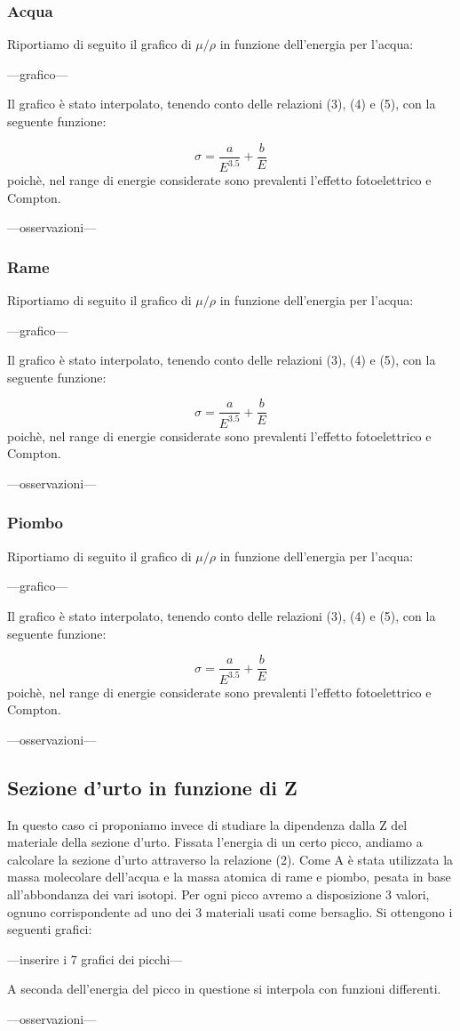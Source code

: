 \documentclass[a4paper,10pt]{article}
\begin{document}
\subsubsection{Acqua}
Riportiamo di seguito il grafico di $\mu/\rho$ in funzione dell'energia per l'acqua:

---grafico---

Il grafico è stato interpolato, tenendo conto delle relazioni (3), (4) e (5), con la seguente funzione:

\begin{equation}
	\sigma = \frac{a}{E^{3.5}} + \frac{b}{E}
\end{equation}
poichè, nel range di energie considerate sono prevalenti l'effetto fotoelettrico e Compton. 

---osservazioni---

\subsubsection{Rame}
Riportiamo di seguito il grafico di $\mu/\rho$ in funzione dell'energia per l'acqua:

---grafico---

Il grafico è stato interpolato, tenendo conto delle relazioni (3), (4) e (5), con la seguente funzione:

\begin{equation}
	\sigma = \frac{a}{E^{3.5}} + \frac{b}{E}
\end{equation}
poichè, nel range di energie considerate sono prevalenti l'effetto fotoelettrico e Compton. 

---osservazioni---
\subsubsection{Piombo}
Riportiamo di seguito il grafico di $\mu/\rho$ in funzione dell'energia per l'acqua:

---grafico---

Il grafico è stato interpolato, tenendo conto delle relazioni (3), (4) e (5), con la seguente funzione:

\begin{equation}
	\sigma = \frac{a}{E^{3.5}} + \frac{b}{E}
\end{equation}
poichè, nel range di energie considerate sono prevalenti l'effetto fotoelettrico e Compton. 

---osservazioni---

\subsection{Sezione d'urto in funzione di Z}
In questo caso ci proponiamo invece di studiare la dipendenza dalla Z del materiale della sezione d'urto. Fissata l'energia di un certo picco, andiamo a calcolare la sezione d'urto attraverso la relazione (2). Come A è stata utilizzata la massa molecolare dell'acqua e la massa atomica di rame e piombo, pesata in base all'abbondanza dei vari isotopi. Per ogni picco avremo a disposizione 3 valori, ognuno corrispondente ad uno dei 3 materiali usati come bersaglio. Si ottengono i seguenti grafici:

---inserire i 7 grafici dei picchi---

A seconda dell'energia del picco in questione si interpola con funzioni differenti.

---osservazioni---
\end{document}
